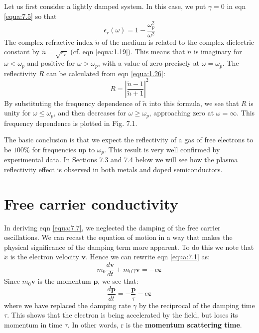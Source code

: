 \documentclass[12pt]{book}
\begin{document}
Let us first consider a lightly damped system. In this case, we put $\gamma = 0$ in eqn \ref{equa:7.5} so that
\begin{equation}\label{equa:7.7}
  \epsilon_r(\omega)=1-\frac{\omega_p^2}{\omega^2}
\end{equation}
The complex refractive index $\tilde{n}$ of the medium is related to the complex dielectric constant by $\tilde{n} = \sqrt{\epsilon_r}$ (cf. eqn \ref{equa:1.19}). This means that $\tilde{n}$ is imaginary for $\omega <\omega_p$ and positive for $\omega > \omega_p$, with a value of zero precisely at $\omega = \omega_p$. The reflectivity $R$ can be calculated from eqn \ref{equa:1.26}:
\begin{equation}\label{equa:7.8}
  R=|\frac{\tilde{n}-1}{\tilde{n}+1}|^2
\end{equation}
By substituting the frequency dependence of $\tilde{n}$ into this formula, we see that $R$ is unity for $\omega\le\omega_p$, and then decreases for $\omega\ge\omega_p$, approaching zero at $\omega=\infty$. This frequency dependence is plotted in Fig. 7.1.

The basic conclusion is that we expect the reflectivity of a gas of free electrons to be $100 \%$ for frequencies up to $\omega_p$. This result is very well confirmed by experimental data. In Sections 7.3 and 7.4 below we will see how the plasma reflectivity effect is observed in both metals and doped semiconductors.

\section{Free carrier conductivity}
In deriving eqn \ref{equa:7.7}, we neglected the damping of the free carrier oscillations. We can recast the equation of motion in a way that makes the physical significance of the damping term more apparent. To do this we note that $\dot{x}$ is the electron velocity $\mathbf{v}$. Hence we can rewrite eqn \ref{equa:7.1} as:
\begin{equation}\label{equa:7.9}
  m_0\frac{d\mathbf{v}}{dt}+m_0\gamma\mathbf{v}=-e\bm{\varepsilon}
\end{equation}
Since $m_0\mathbf{v}$ is the momentum $\mathbf{p}$, we see that:
\begin{equation}\label{equa:7.10}
  \frac{d\mathbf{p}}{dt}=-\frac{\mathbf{p}}{\tau}-e\bm{\varepsilon}
\end{equation}
where we have replaced the damping rate $\gamma$ by the reciprocal of the damping time $\tau$. This shows that the electron is being accelerated by the field, but loses its momentum in time $\tau$. In other words, r is the \textbf{momentum scattering time}.
\end{document}

